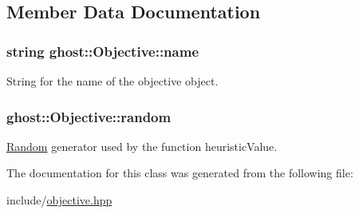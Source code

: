\subsection{Member Data Documentation}
\subsubsection[{\texorpdfstring{name}{name}}]{\setlength{\rightskip}{0pt plus 5cm}string ghost\+::\+Objective\+::name\hspace{0.3cm}{\ttfamily [protected]}}\hypertarget{classghost_1_1Objective_af5bf0605c193884ad7f53593dabe8b85}{}\label{classghost_1_1Objective_af5bf0605c193884ad7f53593dabe8b85}


String for the name of the objective object. 

\subsubsection[{\texorpdfstring{random}{random}}]{ ghost\+::\+Objective\+::random\hspace{0.3cm}{\ttfamily [protected]}}\hypertarget{classghost_1_1Objective_a86081d1ebbab1fe6f781841d9ac8d546}{}\label{classghost_1_1Objective_a86081d1ebbab1fe6f781841d9ac8d546}


\hyperlink{classghost_1_1Random}{Random} generator used by the function heuristic\+Value. 



The documentation for this class was generated from the following file\+:\begin{DoxyCompactItemize}
\item 
include/\hyperlink{objective_8hpp}{objective.\+hpp}\end{DoxyCompactItemize}
